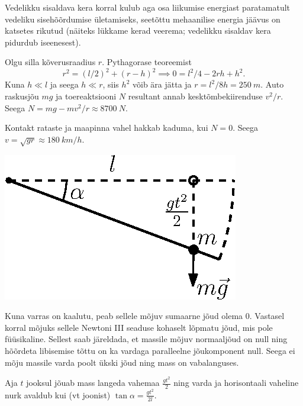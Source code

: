 \documentclass[10pt]{article}
\begin{document}
{Vedelikku sisaldava kera korral kulub aga osa liikumise energiast paratamatult
vedeliku sisehõõrdumise ületamiseks, seetõttu mehaanilise energia jäävus on katsetes
rikutud (näiteks lükkame kerad veerema; vedelikku sisaldav kera pidurdub iseenesest).
\probend
\bigskip


\solu
Olgu
silla kõverusraadius $r$. Pythagorase teoreemist
\[
r^2=(l/2)^2+(r-h)^2\implies 0=l^2/4-2rh+h^2.
\]
Kuna $h\ll l$ ja seega $h\ll r$, siis $h^2$ võib ära jätta ja $r=l^2/8h=\SI{250}{m}$.
Auto raskusjõu $mg$ ja toereaktsiooni $N$ resultant annab kesktõmbekiirenduse $v^2/r$.
Seega $N=mg-mv^2/r\approx\SI{8700}{N}$.

Kontakt rataste ja maapinna vahel hakkab kaduma, kui $N=0$. Seega $v=\sqrt{gr}\approx
\SI{180}{km/h}$.
\probend
\bigskip


\solu
\begin{center}
	\includegraphics[width = 0.5\linewidth]{2011-v3g-02-varras_lah.eps}
\end{center}

Kuna varras on kaalutu, peab sellele mõjuv sumaarne jõud olema \num{0}. Vastasel korral mõjuks sellele Newtoni III seaduse kohaselt lõpmatu jõud, mis pole füüsikaline. Sellest saab järeldada, et massile mõjuv normaaljõud on null ning hõõrdeta libisemise tõttu on ka vardaga paralleelne jõukomponent null. Seega ei mõju massile varda poolt ükski jõud ning mass on vabalanguses. 

Aja $t$ jooksul jõuab mass langeda vahemaa $\frac{gt^2}{2}$ ning varda ja horisontaali vaheline nurk avaldub kui (vt joonist) $\tan\alpha = \frac{gt^2}{2l}$.
\probend
\bigskip


}
\end{document}
